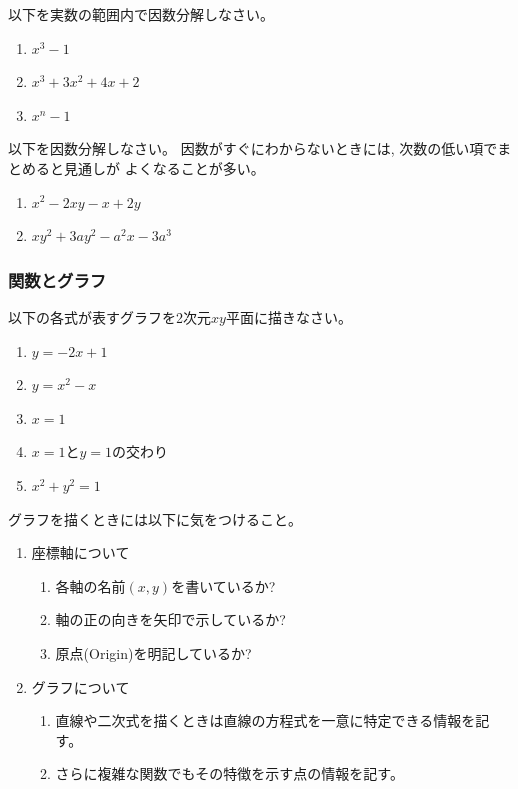 \documentclass[twocolumn,11pt]{jarticle}
\begin{document}
\nquestion
以下を実数の範囲内で因数分解しなさい。
\begin{enumerate}
\item $x^3-1$
\item $x^3+3x^2+4x+2$
\item $x^n-1$
\end{enumerate}

\nquestion 以下を因数分解しなさい。
因数がすぐにわからないときには, 次数の低い項でまとめると見通しが
  よくなることが多い。
\begin{enumerate}
\item $x^2-2xy-x+2y$
\item $xy^2+3ay^2-a^2x-3a^3$
\end{enumerate}

\subsubsection{関数とグラフ}

\nquestion
以下の各式が表すグラフを2次元$xy$平面に描きなさい。
\begin{enumerate}
\item $y=-2x+1$
\item $y=x^2-x$
\item $x=1$
\item $x=1$と$y=1$の交わり
\item $x^2+y^2=1$
\end{enumerate}

\comment
グラフを描くときには以下に気をつけること。
\begin{enumerate}
\item 座標軸について
  \begin{enumerate}
  \item 各軸の名前$(x,y)$を書いているか?
  \item 軸の正の向きを矢印で示しているか?
  \item 原点(Origin)を明記しているか?
  \end{enumerate}
\item グラフについて
  \begin{enumerate}
  \item 直線や二次式を描くときは直線の方程式を一意に特定できる情報を記す。
  \item さらに複雑な関数でもその特徴を示す点の情報を記す。
  \end{enumerate}
\end{enumerate}
\end{document}
